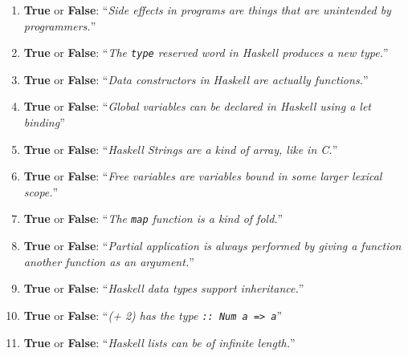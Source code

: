 \documentclass[12pt]{article}
\begin{document}
\begin{enumerate}
\item {\bf True} or {\bf False}: ``\emph{Side effects in programs are things that are unintended by programmers.}''
\vspace{1ex}

\item {\bf True} or {\bf False}: ``\emph{The {\tt type} reserved word in Haskell produces a new type.}''
\vspace{1ex}

\item {\bf True} or {\bf False}: ``\emph{Data constructors in Haskell are actually functions.}''
\vspace{1ex}

\item {\bf True} or {\bf False}: ``\emph{Global variables can be declared in Haskell using a let binding}''
\vspace{1ex}

\item {\bf True} or {\bf False}: ``\emph{Haskell Strings are a kind of array, like in C.}''
\vspace{1ex}

\item {\bf True} or {\bf False}: ``\emph{Free variables are variables bound in some larger lexical scope.}''
\vspace{1ex}

\item {\bf True} or {\bf False}: ``\emph{The {\tt map} function is a kind of fold.}''
\vspace{1ex}

\item {\bf True} or {\bf False}: ``\emph{Partial application is always performed by giving a function another function as an argument.}''
\vspace{1ex}

\item {\bf True} or {\bf False}: ``\emph{Haskell data types support inheritance.}''
\vspace{1ex}

\item {\bf True} or {\bf False}: ``\emph{(+ 2) has the type {\tt :: Num a => a}}''
\vspace{1ex}

\item {\bf True} or {\bf False}: ``\emph{Haskell lists can be of infinite length.}''
\vspace{1ex}



\end{enumerate}
\end{document}
